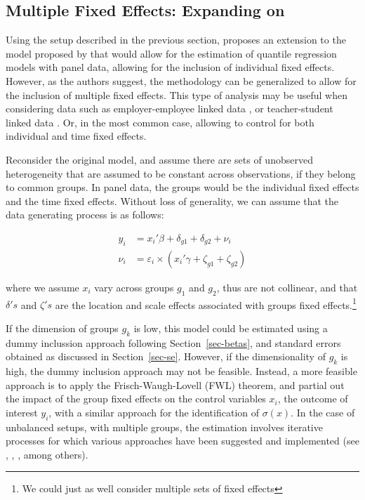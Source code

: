 \documentclass[
  authoryear,
  preprint,
  1p]{elsarticle}
\begin{document}
\hypertarget{multiple-fixed-effects-expanding-on-mss2019}{%
\subsection{\texorpdfstring{Multiple Fixed Effects: Expanding on
\citet{mss2019}}{Multiple Fixed Effects: Expanding on @mss2019}}\label{multiple-fixed-effects-expanding-on-mss2019}}

Using the setup described in the previous section, \citet{mss2019}
proposes an extension to the model proposed by \citet{he1997} that would
allow for the estimation of quantile regression models with panel data,
allowing for the inclusion of individual fixed effects. However, as the
authors suggest, the methodology can be generalized to allow for the
inclusion of multiple fixed effects. This type of analysis may be useful
when considering data such as employer-employee linked data
\citep{abowed2006}, or teacher-student linked data
\citep{harrissass2011}. Or, in the most common case, allowing to control
for both individual and time fixed effects.

Reconsider the original model, and assume there are sets of unobserved
heterogeneity that are assumed to be constant across observations, if
they belong to common groups. In panel data, the groups would be the
individual fixed effects and the time fixed effects. Without loss of
generality, we can assume that the data generating process is as
follows:

\[\begin{aligned}
  y_{i} &= x_{i}' \beta + \delta_{g1} + \delta_{g2} + \nu_i \\
  \nu_i &= \varepsilon_i \times (x_{i}' \gamma + \zeta_{g1} + \zeta_{g2})   
  \end{aligned}
\]

where we assume \(x_{i}\) vary across groups \(g_1\) and \(g_2\), thus
are not collinear, and that \(\delta's\) and \(\zeta's\) are the
location and scale effects associated with groups fixed
effects.\footnote{We could just as well consider multiple sets of fixed
  effects}

If the dimension of groups \(g_k\) is low, this model could be estimated
using a dummy inclussion approach following Section~\ref{sec-betas}, and
standard errors obtained as discussed in Section~\ref{sec-se}. However,
if the dimensionality of \(g_k\) is high, the dummy inclusion approach
may not be feasible. Instead, a more feasible approach is to apply the
Frisch-Waugh-Lovell (FWL) theorem, and partial out the impact of the
group fixed effects on the control variables \(x_{i}\), the outcome of
interest \(y_{i}\), with a similar approach for the identification of
\(\sigma(x)\). In the case of unbalanced setups, with multiple groups,
the estimation involves iterative processes for which various approaches
have been suggested and implemented (see
\citet{correia_feasible_nodate}, \citet{gaure2013}, \citet{rios2015},
among others).
\end{document}
